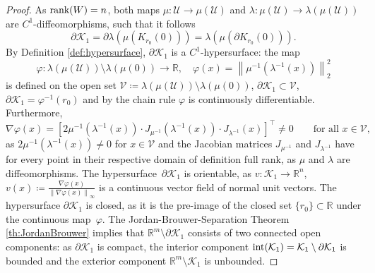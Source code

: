 \documentclass[10pt]{article}
\numberwithin{equation}{section}
\newcommand\norm[1]{\left\lVert#1\right\rVert}
\begin{document}
	\begin{proof}
		As $\textup{rank}(W) = n$, both maps $\mu:\mathcal{U}\rightarrow \mu(\mathcal{U})$ and $\lambda: \mu(\mathcal{U})\rightarrow \lambda(\mu(\mathcal{U}))$ are  $C^1$-diffeomorphisms, such that  it follows
		\begin{equation*}
			\partial \mathcal{K}_1 =  \partial \lambda(\mu(K_{r_0}(0))) =  \lambda(\mu(\partial K_{r_0}(0))).
		\end{equation*}
		By Definition \ref{def:hypersurface}, $\partial\mathcal{K}_1$ is a $C^1$-hypersurface: the map
		\begin{equation*}
			\varphi: \lambda(\mu(\mathcal{U}))\setminus \lambda(\mu(0))\rightarrow\mathbb{R}, \quad \varphi(x) = \norm{\mu^{-1}(\lambda^{-1}(x))}_2^2
		\end{equation*}
		is defined on the open set $\mathcal{V} \coloneqq \lambda(\mu(\mathcal{U}))\setminus \lambda(\mu(0))$, $\partial \mathcal{K}_1 \subset \mathcal{V}$, $\partial \mathcal{K}_1 = \varphi^{-1}(r_0)$ and by the chain rule $\varphi$ is continuously differentiable. Furthermore,
		\begin{equation*}
			\nabla \varphi(x)= \left[2 \mu^{-1}(\lambda^{-1}(x)) \cdot J_{\mu^{-1}}(\lambda^{-1}(x)) \cdot J_{\lambda^{-1}}(x)\right]^\top \neq 0 \qquad \text{for all } x \in \mathcal{V},
		\end{equation*}
		as $2 \mu^{-1}(\lambda^{-1}(x)) \neq 0$ for $x \in \mathcal{V}$ and the Jacobian matrices $J_{\mu^{-1}}$ and $J_{\lambda^{-1}}$ have for every point in their respective domain of definition full rank, as $\mu$ and $\lambda$ are diffeomorphisms. The hypersurface~$\partial\mathcal{K}_1$ is orientable, as $v:\mathcal{K}_1\rightarrow \mathbb{R}^n$, $v(x) \coloneqq \frac{\nabla \varphi(x)}{\norm{\nabla \varphi(x)}_\infty}$ is a continuous vector field of normal unit vectors. The hypersurface $\partial\mathcal{K}_1$ is closed, as it is the pre-image of the closed set $\{r_0\}\subset \mathbb{R}$ under the continuous map~$\varphi$. The Jordan-Brouwer-Separation Theorem \ref{th:JordanBrouwer} implies that $\mathbb{R}^m\setminus \partial \mathcal{K}_1$ consists of two connected open components: as $\partial \mathcal{K}_1$ is compact, the interior component $\textup{int}(\mathcal{K}_1) = \mathcal{K}_1\setminus \partial \mathcal{K}_1$ is bounded and the exterior component $\mathbb{R}^m\setminus \mathcal{K}_1$ is unbounded.
	\end{proof}
	
\end{document}

